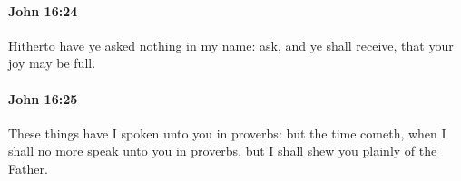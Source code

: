 		\paragraph{John 16:24} %
			\label{JOHN-16-24}

			Hitherto have ye asked nothing in my name: ask, and ye shall receive, that your joy may be full.

			\begin{framed}
				\scriptsize
				\begin{compactdesc}
					\item[SBLG] 
				\end{compactdesc}
			\end{framed}

		\paragraph{John 16:25} %
			\label{JOHN-16-25}

			These things have I spoken unto you in proverbs: but the time cometh, when I shall no more speak unto you in proverbs, but I shall shew you plainly of the Father.

